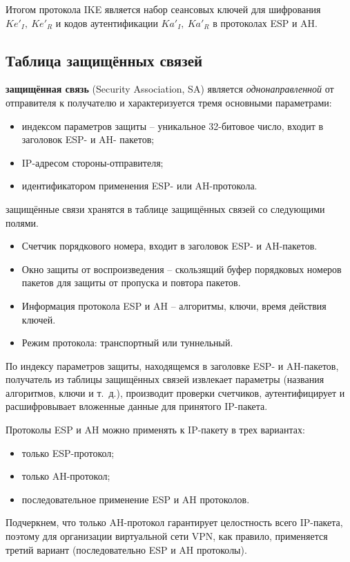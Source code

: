Итогом протокола IKE является набор сеансовых ключей для шифрования $Ke'_I, ~ Ke'_R$ и кодов аутентификации $Ka'_I, ~ Ka'_R$ в протоколах ESP и AH.


\subsection{Таблица защищённых связей}

\textbf{защищённая связь} (Security Association, SA) является \emph{однонаправленной} от отправителя к получателю и характеризуется тремя основными параметрами:
\begin{itemize}
    \item индексом параметров защиты -- уникальное 32-битовое число, входит в заголовок ESP- и AH- пакетов;
    \item IP-адресом стороны-отправителя;
    \item идентификатором применения ESP- или AH-протокола.
\end{itemize}

защищённые связи хранятся в таблице защищённых связей со следующими полями.
\begin{itemize}
    \item Счетчик порядкового номера, входит в заголовок ESP- и AH-пакетов.
    \item Окно защиты от воспроизведения -- скользящий буфер порядковых номеров пакетов для защиты от пропуска и повтора пакетов.
    \item Информация протокола ESP и AH -- алгоритмы, ключи, время действия ключей.
    \item Режим протокола: транспортный или туннельный.
\end{itemize}

По индексу параметров защиты, находящемся в заголовке ESP- и AH-пакетов, получатель из таблицы защищённых связей извлекает параметры (названия алгоритмов, ключи и т.~д.), производит проверки счетчиков, аутентифицирует и расшифровывает вложенные данные для принятого IP-пакета.

Протоколы ESP и AH можно применять к IP-пакету в трех вариантах:
\begin{itemize}
    \item только ESP-протокол;
     \item только AH-протокол;
    \item последовательное применение ESP и AH протоколов.
\end{itemize}
Подчеркнем, что только AH-протокол гарантирует целостность всего IP-пакета, поэтому для организации виртуальной сети VPN, как правило, применяется третий вариант (последовательно ESP и AH протоколы).



